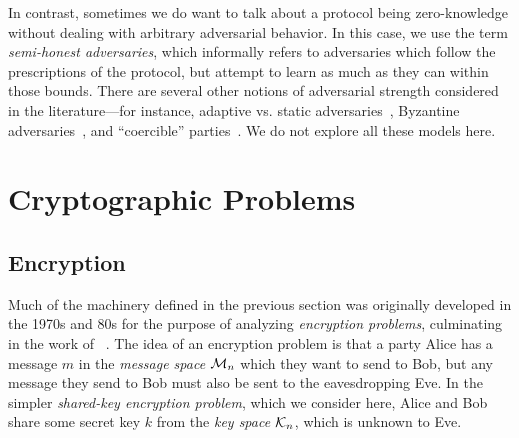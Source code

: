 In contrast, sometimes we do want to talk about a protocol being zero-knowledge
without dealing with arbitrary adversarial behavior. In this case, we use the
term \emph{semi-honest adversaries}, which informally refers to adversaries
which follow the prescriptions of the protocol, but attempt to learn as much as
they can within those bounds. There are several other notions of adversarial
strength considered in the literature---for instance, adaptive vs. static
adversaries~\cite{asharov-et-al-2022}, Byzantine
adversaries~\cite{lindell-et-al-2002}, and ``coercible''
parties~\cite{canetti-et-al-2015}. We do not explore all these models here.

\section{Cryptographic Problems}
\label{sec:crypto-problems}

\subsection{Encryption}

Much of the machinery defined in the previous section was originally developed
in the 1970s and 80s for the purpose of analyzing \emph{encryption problems},
culminating in the work of
\citeauthor{goldwasser-micali-1982}~\cite{goldwasser-micali-1982}. The idea of
an encryption problem is that a party Alice has a message $m$ in the
\emph{message space} $\mathcal{M}_n$ which they want to send to Bob, but any message
they send to Bob must also be sent to the eavesdropping Eve. In the simpler
\emph{shared-key encryption problem}, which we consider here, Alice and Bob
share some secret key $k$ from the \emph{key space $\mathcal{K}_n$}, which is unknown to
Eve.


